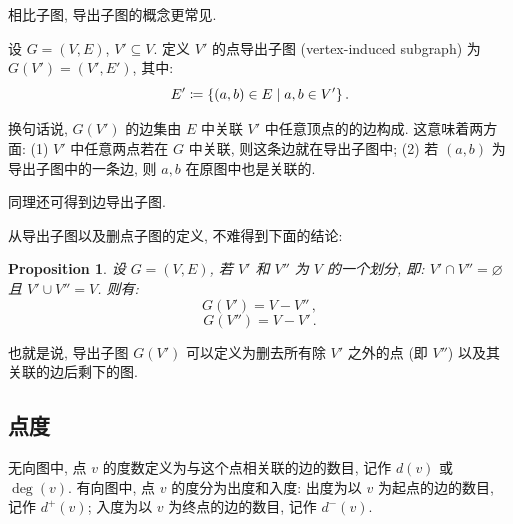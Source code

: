 \documentclass[UTF8]{ctexart}
\theoremstyle{mystyle}
\newtheorem{proposition}{Proposition}[section]
\theoremstyle{myremark}
\theoremstyle{plain}
\DeclarePairedDelimiter\set{\{}{\}}
\begin{document}
相比子图, 导出子图的概念更常见.

\begin{definition}
    设 $ G = (V, E) $, $ V' \subseteq V $. 定义 $ V' $ 的点导出子图 (vertex-induced subgraph) 为 $ G(V') = (V', E') $, 其中:
    \[ E' \coloneqq \set{(a, b) \in E \mid a, b \in V'} \,.\]
\end{definition}

换句话说, $ G(V') $ 的边集由 $ E $ 中关联 $ V' $ 中任意顶点的的边构成. 这意味着两方面: (1) $ V' $ 中任意两点若在 $ G $ 中关联, 则这条边就在导出子图中; (2) 若 $ (a, b) $ 为导出子图中的一条边, 则 $ a, b $ 在原图中也是关联的.

同理还可得到边导出子图.


从导出子图以及删点子图的定义, 不难得到下面的结论:
\begin{proposition}
    设 $ G = (V, E) $, 若 $ V' $ 和 $ V'' $ 为 $ V $ 的一个划分, 即: $ V' \cap V'' = \varnothing $ 且 $ V' \cup V'' = V $. 则有:
    \[ G(V') = V - V'' \,,\]
    \[ G(V'') = V - V' \,.\]
\end{proposition}

也就是说, 导出子图 $ G(V') $ 可以定义为删去所有除 $ V' $ 之外的点 (即 $ V'' $) 以及其关联的边后剩下的图.

\subsection{点度}
\begin{definition}[\text{度}]
    无向图中, 点 $ v $ 的度数定义为与这个点相关联的边的数目, 记作 $ d(v) $ 或 $ \deg(v) $. 有向图中, 点 $ v $ 的度分为出度和入度: 出度为以 $ v $ 为起点的边的数目, 记作 $ d^+(v) $; 入度为以 $ v $ 为终点的边的数目, 记作 $ d^-(v) $.
\end{definition}
\end{document}
